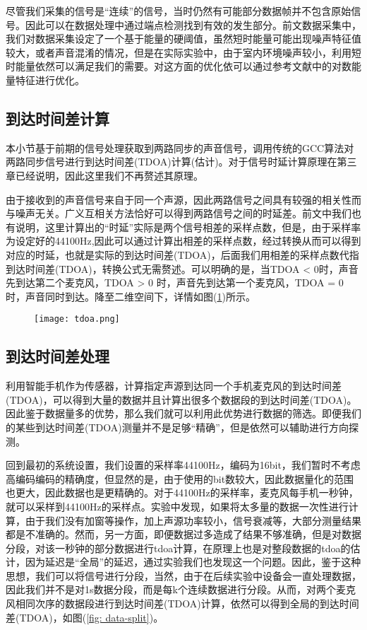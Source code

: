 \documentclass[winfonts]{njuthesis}
\begin{document}
			尽管我们采集的信号是“连续”的信号，当时仍然有可能部分数据帧并不包含原始信号。因此可以在数据处理中通过端点检测找到有效的发生部分。前文数据采集中，我们对数据采集设定了一个基于能量的硬阈值，虽然短时能量可能出现噪声特征值较大，或者声音混淆的情况，但是在实际实验中，由于室内环境噪声较小，利用短时能量依然可以满足我们的需要。对这方面的优化依可以通过参考文献\cite{Endpoint_detection}中的对数能量特征进行优化。
		
		\subsection{到达时间差计算}
			
			本小节基于前期的信号处理获取到两路同步的声音信号，调用传统的GCC算法对两路同步信号进行到达时间差(TDOA)计算(估计)。对于信号时延计算原理在第三章已经说明，因此这里我们不再赘述其原理。
			
			由于接收到的声音信号来自于同一个声源，因此两路信号之间具有较强的相关性而与噪声无关。广义互相关方法恰好可以得到两路信号之间的时延差。前文中我们也有说明，这里计算出的“时延”实际是两个信号相差的采样点数，但是，由于采样率为设定好的44100Hz,因此可以通过计算出相差的采样点数，经过转换从而可以得到对应的时延，也就是实际的到达时间差(TDOA)，后面我们用相差的采样点数代指到达时间差(TDOA)，转换公式无需赘述。可以明确的是，当TDOA < 0时，声音先到达第二个麦克风，TDOA > 0 时，声音先到达第一个麦克风，TDOA = 0 时，声音同时到达。降至二维空间下，详情如图(\ref{fig: tdoa})所示。
			
			\begin{figure}[H]
				\centering
				\texttt{[image: tdoa.png]} 
				\caption{{}}
				\label{fig: tdoa}
			\end{figure}
		
		\subsection{到达时间差处理}
		
		利用智能手机作为传感器，计算指定声源到达同一个手机麦克风的到达时间差(TDOA)，可以得到大量的数据并且计算出很多个数据段的到达时间差(TDOA)。因此鉴于数据量多的优势，那么我们就可以利用此优势进行数据的筛选。即便我们的某些到达时间差(TDOA)测量并不是足够“精确”，但是依然可以辅助进行方向探测。
		
		回到最初的系统设置，我们设置的采样率44100Hz，编码为16bit，我们暂时不考虑高编码编码的精确度，但显然的是，由于使用的bit数较大，因此数据量化的范围也更大，因此数据也是更精确的。对于44100Hz的采样率，麦克风每手机一秒钟，就可以采样到44100Hz的采样点。实验中发现，如果将太多量的数据一次性进行计算，由于我们没有加窗等操作，加上声源功率较小，信号衰减等，大部分测量结果都是不准确的。然而，另一方面，即便数据过多造成了结果不够准确，但是对数据分段，对该一秒钟的部分数据进行tdoa计算，在原理上也是对整段数据的tdoa的估计，因为延迟是“全局”的延迟，通过实验我们也发现这一个问题。因此，鉴于这种思想，我们可以将信号进行分段，当然，由于在后续实验中设备会一直处理数据，因此我们并不是对1s数据分段，而是每k个连续数据进行分段。从而，对两个麦克风相同次序的数据段进行到达时间差(TDOA)计算，依然可以得到全局的到达时间差(TDOA)，如图(\ref{fig: data-split})。
		
\end{document}
